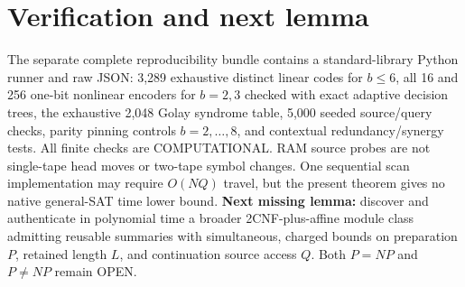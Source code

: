\documentclass[10pt]{article}
\begin{document}
\section{Verification and next lemma}
The separate complete reproducibility bundle contains a standard-library Python runner and raw JSON: 3,289 exhaustive distinct linear codes for $b\le6$, all 16 and 256 one-bit nonlinear encoders for $b=2,3$ checked with exact adaptive decision trees, the exhaustive 2,048 Golay syndrome table, 5,000 seeded source/query checks, parity pinning controls $b=2,\ldots,8$, and contextual redundancy/synergy tests. All finite checks are COMPUTATIONAL. RAM source probes are not single-tape head moves or two-tape symbol changes. One sequential scan implementation may require $O(NQ)$ travel, but the present theorem gives no native general-SAT time lower bound.
\noindent\textbf{Next missing lemma:} discover and authenticate in polynomial time a broader 2CNF-plus-affine module class admitting reusable summaries with simultaneous, charged bounds on preparation $P$, retained length $L$, and continuation source access $Q$. Both $P=NP$ and $P\ne NP$ remain OPEN.
\end{document}
